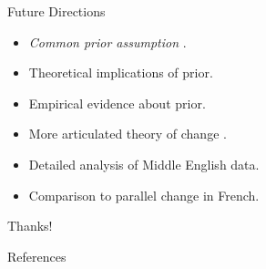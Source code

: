 \documentclass[compress]{beamer}
\begin{document}
\begin{frame}{Future Directions}
\begin{block}{}
 \begin{itemize}
  \item \emph{Common prior assumption} \cite{harsanyi:1967}.
  \item Theoretical implications of prior.
  \item Empirical evidence about prior.
 \end{itemize}
\end{block}

\begin{block}{}
 \begin{itemize}
  \item More articulated theory of change \cite{frisch1997,wallage2008}.
  \item Detailed analysis of Middle English data.
  \item Comparison to parallel change in French.
 \end{itemize}
\end{block}
\end{frame}


\begin{frame}
\begin{center}
\huge Thanks!
\end{center}
\end{frame}


% 
\begin{frame}[allowframebreaks]{References}

\footnotesize{}
\end{frame}
\end{document}

